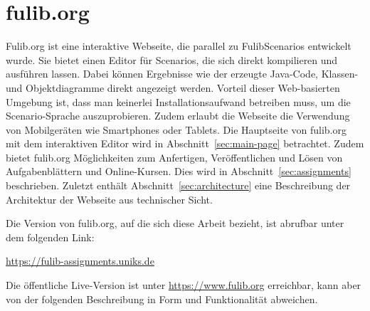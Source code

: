 \chapter{fulib.org}\label{ch:fulib.org}

Fulib.org ist eine interaktive Webseite, die parallel zu FulibScenarios entwickelt wurde.
Sie bietet einen Editor für Scenarios, die sich direkt kompilieren und ausführen lassen.
Dabei können Ergebnisse wie der erzeugte Java-Code, Klassen- und Objektdiagramme direkt angezeigt werden.
Vorteil dieser Web-basierten Umgebung ist, dass man keinerlei Installationsaufwand betreiben muss,
um die Scenario-Sprache auszuprobieren.
Zudem erlaubt die Webseite die Verwendung von Mobilgeräten wie Smartphones oder Tablets.
Die Hauptseite von fulib.org mit dem interaktiven Editor wird in Abschnitt~\ref{sec:main-page} betrachtet.
Zudem bietet fulib.org Möglichkeiten zum Anfertigen, Veröffentlichen und Lösen von Aufgabenblättern und Online-Kursen.
Dies wird in Abschnitt~\ref{sec:assignments} beschrieben.
Zuletzt enthält Abschnitt~\ref{sec:architecture} eine Beschreibung der Architektur der Webseite aus technischer Sicht.

Die Version von fulib.org, auf die sich diese Arbeit bezieht, ist abrufbar unter dem folgenden Link:

\begin{center}
    \url{https://fulib-assignments.uniks.de}
\end{center}

Die öffentliche Live-Version ist unter \url{https://www.fulib.org} erreichbar,
kann aber von der folgenden Beschreibung in Form und Funktionalität abweichen.




